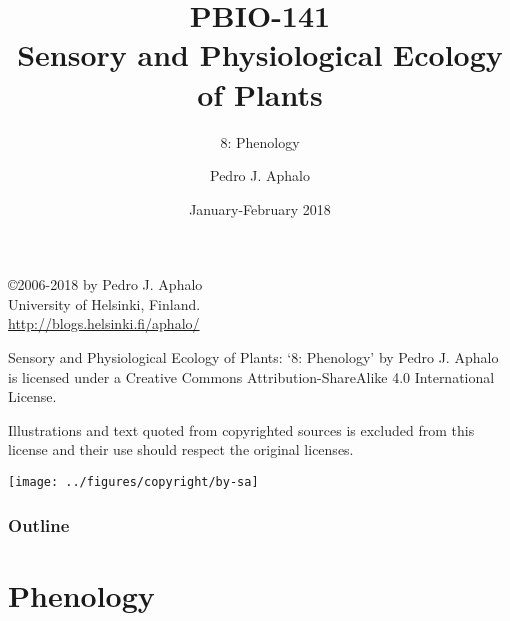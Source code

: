 \documentclass[10pt]{beamer}
\begin{document}
\title{PBIO-141\\Sensory and Physiological Ecology of  Plants}
\subtitle{8: Phenology}
\author{Pedro J. Aphalo}
\date{January-February 2018}


  \begin{frame}
    \maketitle
  \end{frame}

  \begin{frame}[c]
    \begin{center}
      \begin{small}
        \copyright 2006-2018 by Pedro J. Aphalo\\
       University of Helsinki, Finland.\\
        \textcolor{blue}{\url{http://blogs.helsinki.fi/aphalo/}}\\[2ex]
      \end{small}

      \begin{footnotesize}
        Sensory and Physiological Ecology of  Plants: `8: Phenology' by Pedro J. Aphalo is licensed under a Creative Commons Attribution-ShareAlike 4.0 International License.

        Illustrations and text quoted from copyrighted sources is excluded from this license and their use should respect the original licenses.\\[2ex]
      \end{footnotesize}

      \texttt{[image: ../figures/copyright/by-sa]}
    \end{center}
  \end{frame}

  \begin{frame}
    \frametitle{Outline}
    \tableofcontents
  \end{frame}

\section{Phenology}
\end{document}
